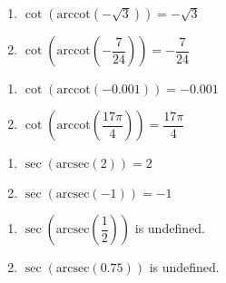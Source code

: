 \begin{multicols}{2}

\begin{enumerate}

\setcounter{enumi}{\value{HW}}

\item $\cot\left(\text{arccot}\left(-\sqrt{3}\right)\right) = -\sqrt{3}$ 
\item $\cot\left(\text{arccot}\left(-\dfrac{7}{24}\right)\right) = -\dfrac{7}{24}$

\setcounter{HW}{\value{enumi}}

\end{enumerate}

\end{multicols}

\begin{multicols}{2}

\begin{enumerate}

\setcounter{enumi}{\value{HW}}

\item $\cot\left(\text{arccot}\left(-0.001\right)\right) = -0.001$ 
\item $\cot\left(\text{arccot}\left( \dfrac{17\pi}{4} \right)\right) = \dfrac{17\pi}{4}$

\setcounter{HW}{\value{enumi}}

\end{enumerate}

\end{multicols}

\begin{multicols}{2}

\begin{enumerate}

\setcounter{enumi}{\value{HW}}

\item $\sec\left(\text{arcsec}\left(2\right)\right) = 2$
\item $\sec\left(\text{arcsec}\left(-1\right)\right) = -1$

\setcounter{HW}{\value{enumi}}

\end{enumerate}

\end{multicols}

\begin{multicols}{2}

\begin{enumerate}

\setcounter{enumi}{\value{HW}}

\item $\sec\left(\text{arcsec}\left(\dfrac{1}{2}\right)\right)$ is undefined.
\item $\sec\left(\text{arcsec}\left(0.75\right)\right)$ is undefined. 

\setcounter{HW}{\value{enumi}}

\end{enumerate}

\end{multicols}

